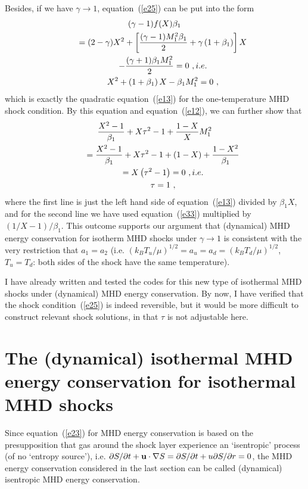 \documentclass[fleqn,usenatbib]{mnras}
\begin{document}
Besides, if we have $\gamma\rightarrow 1$, equation~(\ref{e25}) can be put into the form
\begin{gather}
(\gamma-1)f(X)\beta_{1}\notag\\
\qquad =(2-\gamma)X^{2}+\left[\frac{(\gamma-1)M_{1}^{2}\beta_{1}}{2}+\gamma\left(1+\beta_{1}\right)\right]X\notag\\
\qquad -\frac{(\gamma+1)\beta_{1}M_{1}^{2}}{2}=0\ ,i.e.\notag\\
\qquad X^{2}+\left(1+\beta_{1}\right)X-\beta_{1}M_{1}^{2}=0\ ,\label{e33}
\end{gather}
which is exactly the quadratic equation~(\ref{e13}) for the one-temperature MHD shock condition. By this equation and equation~(\ref{e12}), we can further show that
\begin{gather}
\frac{X^{2}-1}{\beta_{1}}+X\tau^{2}-1+\frac{1-X}{X}M_{1}^{2}\notag\\
\qquad = \frac{X^{2}-1}{\beta_{1}}+X\tau^{2}-1+(1-X)+\frac{1-X^{2}}{\beta_{1}}\notag\\
\qquad =X\left(\tau^{2}-1\right)=0\ ,i.e.\notag\\
\qquad\tau=1\ ,\label{e35}
\end{gather}
where the first line is just the left hand side of equation~(\ref{e13}) divided by $\beta_{1}X$, and for the second line we have used equation~(\ref{e33}) multiplied by $(1/X-1)/\beta_{1}$. This outcome supports our argument that (dynamical) MHD energy conservation for isotherm MHD shocks under $\gamma\rightarrow 1$ is consistent with the very restriction that $a_{1}=a_{2}$ (i.e. $\left(k_{B}T_{u}/\mu\right)^{1/2}=a_{u}=a_{d}=\left(k_{B}T_{d}/\mu\right)^{1/2}$, $T_{u}=T_{d}$: both sides of the shock have the same temperature).

I have already written and tested the codes for this new type of isothermal MHD shocks under (dynamical) MHD energy conservation. By now, I have verified that the shock condition~(\ref{e25}) is indeed reversible, but it would be more difficult to construct relevant shock solutions, in that $\tau$ is not adjustable here.

\section{The (dynamical) isothermal MHD energy conservation for isothermal MHD shocks}
Since equation~(\ref{e23}) for MHD energy conservation is based on the presupposition that gas around the shock layer experience an `isentropic' process (of no `entropy source'), i.e. $\partial S/\partial t+{\bf{u}} \cdot\nabla S=\partial S/\partial t+u\partial S/\partial r=0$, the MHD energy conservation considered in the last section can be called (dynamical) isentropic MHD energy conservation. 
\end{document}
